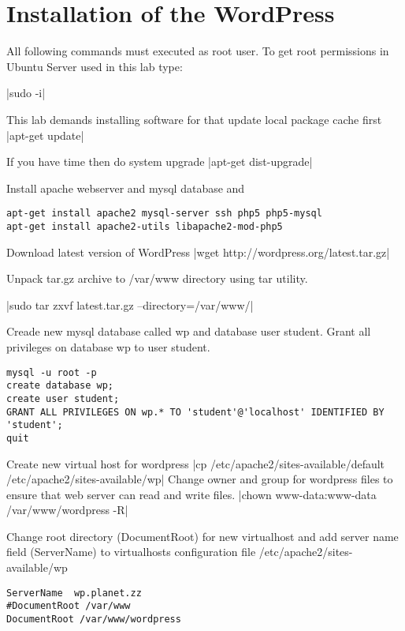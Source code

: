 \section{Installation of the WordPress}
All following commands must executed as root user. To get root permissions in Ubuntu Server used in this lab type:

|sudo -i|


This lab demands installing software for that update local package cache first
|apt-get update|

If you have time then do system upgrade
|apt-get dist-upgrade|

Install apache webserver and mysql database and 
\begin{verbatim}
apt-get install apache2 mysql-server ssh php5 php5-mysql 
apt-get install apache2-utils libapache2-mod-php5
\end{verbatim}

Download latest version of WordPress
|wget http://wordpress.org/latest.tar.gz|

Unpack tar.gz archive to  /var/www directory using tar utility.

|sudo tar zxvf latest.tar.gz --directory=/var/www/|

Creade new mysql database called wp and database user student. Grant all privileges on database wp to user student.

\begin{verbatim}
mysql -u root -p
create database wp;
create user student;
GRANT ALL PRIVILEGES ON wp.* TO 'student'@'localhost' IDENTIFIED BY 'student';
quit
\end{verbatim}

Create new virtual host for wordpress 
|cp /etc/apache2/sites-available/default /etc/apache2/sites-available/wp|
Change owner and group for wordpress files to ensure that web server can read and write files.
|chown www-data:www-data /var/www/wordpress -R|

Change root directory (DocumentRoot) for new virtualhost and add server name field (ServerName) to virtualhosts configuration file   /etc/apache2/sites-available/wp


\begin{verbatim}
ServerName	wp.planet.zz
#DocumentRoot /var/www
DocumentRoot /var/www/wordpress
\end{verbatim}


